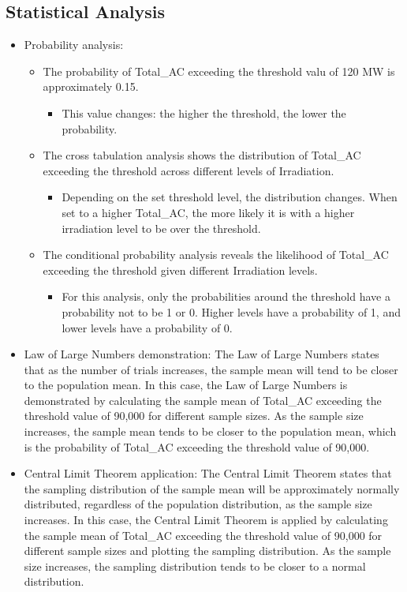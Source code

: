 \documentclass[10pt]{article}
\begin{document}
\subsection{Statistical Analysis}
\begin{itemize}
    \item Probability analysis: 
    \begin{itemize}
        \item The probability of Total\_AC exceeding the threshold valu of 120 MW is approximately 0.15.
    \begin{itemize}
        \item This value changes: the higher the threshold, the lower the probability.
    \end{itemize}
    \item The cross tabulation analysis shows the distribution of Total\_AC exceeding the threshold across different levels of Irradiation.
    \begin{itemize}
        \item Depending on the set threshold level, the distribution changes. When set to a higher Total\_AC, the more likely it is with a higher irradiation level to be over the threshold.
    \end{itemize}
    \item The conditional probability analysis reveals the likelihood of Total\_AC exceeding the threshold given different Irradiation levels.
    \begin{itemize}
        \item For this analysis, only the probabilities around the threshold have a probability not to be 1 or 0. Higher levels have a probability of 1, and lower levels have a probability of 0.
    \end{itemize}
\end{itemize}
    \item Law of Large Numbers demonstration: The Law of Large Numbers states that as the number of trials increases, the sample mean will tend to be closer to the population mean. In this case, the Law of Large Numbers is demonstrated by calculating the sample mean of Total\_AC exceeding the threshold value of 90,000 for different sample sizes. As the sample size increases, the sample mean tends to be closer to the population mean, which is the probability of Total\_AC exceeding the threshold value of 90,000.
    \item Central Limit Theorem application: The Central Limit Theorem states that the sampling distribution of the sample mean will be approximately normally distributed, regardless of the population distribution, as the sample size increases. In this case, the Central Limit Theorem is applied by calculating the sample mean of Total\_AC exceeding the threshold value of 90,000 for different sample sizes and plotting the sampling distribution. As the sample size increases, the sampling distribution tends to be closer to a normal distribution.

\end{itemize}
\end{document}
